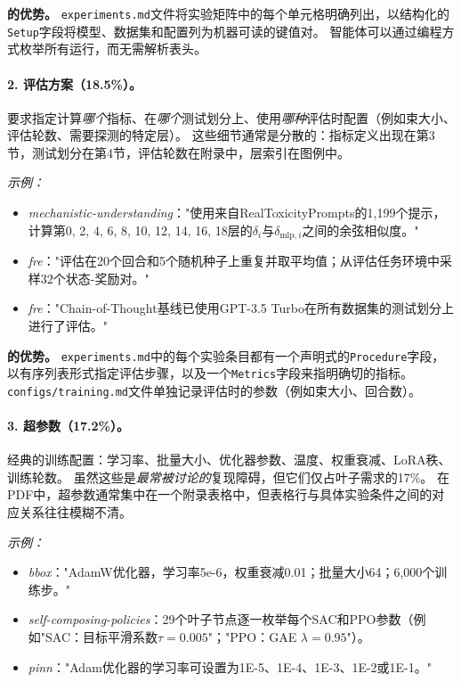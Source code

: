 \noindent\textbf{\ara{}的优势。}
\texttt{experiments.md}文件将实验矩阵中的每个单元格明确列出，以结构化的\texttt{Setup}字段将模型、数据集和配置列为机器可读的键值对。
智能体可以通过编程方式枚举所有运行，而无需解析表头。

\paragraph{2. 评估方案（18.5\%）。}
要求指定计算\emph{哪个}指标、在\emph{哪个}测试划分上、使用\emph{哪种}评估时配置（例如束大小、评估轮数、需要探测的特定层）。
这些细节通常是分散的：指标定义出现在第3节，测试划分在第4节，评估轮数在附录中，层索引在图例中。

\emph{示例：}
\begin{itemize}[leftmargin=*, itemsep=1pt]
  \item \emph{mechanistic-understanding}："使用来自RealToxicityPrompts的1{,}199个提示，计算第0, 2, 4, 6, 8, 10, 12, 14, 16, 18层的$\delta_i$与$\delta_{\text{mlp},i}$之间的余弦相似度。"
  \item \emph{fre}："评估在20个回合和5个随机种子上重复并取平均值；从评估任务环境中采样32个状态-奖励对。"
  \item \emph{fre}："Chain-of-Thought基线已使用GPT-3.5 Turbo在所有数据集的测试划分上进行了评估。"
\end{itemize}

\noindent\textbf{\ara{}的优势。}
\texttt{experiments.md}中的每个实验条目都有一个声明式的\texttt{Procedure}字段，以有序列表形式指定评估步骤，以及一个\texttt{Metrics}字段来指明确切的指标。
\texttt{configs/training.md}文件单独记录评估时的参数（例如束大小、回合数）。

\paragraph{3. 超参数（17.2\%）。}
经典的训练配置：学习率、批量大小、优化器参数、温度、权重衰减、LoRA秩、训练轮数。
虽然这些是\emph{最常被讨论的}复现障碍，但它们仅占叶子需求的17\%。
在PDF中，超参数通常集中在一个附录表格中，但表格行与具体实验条件之间的对应关系往往模糊不清。

\emph{示例：}
\begin{itemize}[leftmargin=*, itemsep=1pt]
  \item \emph{bbox}："AdamW优化器，学习率5e-6，权重衰减0.01；批量大小64；6{,}000个训练步。"
  \item \emph{self-composing-policies}：29个叶子节点逐一枚举每个SAC和PPO参数（例如"SAC：目标平滑系数$\tau = 0.005$"；"PPO：GAE $\lambda = 0.95$"）。
  \item \emph{pinn}："Adam优化器的学习率可设置为1E-5、1E-4、1E-3、1E-2或1E-1。"
\end{itemize}

